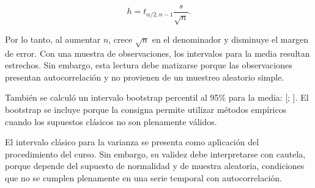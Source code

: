 \[
    h = t_{\alpha/2,n-1}\frac{s}{\sqrt{n}}.
\]

Por lo tanto, al aumentar \(n\), crece \(\sqrt{n}\) en el denominador y disminuye el margen de error. Con una muestra de \TotalRegistros{} observaciones, los intervalos para la media resultan estrechos. Sin embargo, esta lectura debe matizarse porque las observaciones presentan autocorrelación y no provienen de un muestreo aleatorio simple.

También se calculó un intervalo bootstrap percentil al 95\% para la media: [\BootstrapMediaInf{}; \BootstrapMediaSup{}]. El bootstrap se incluye porque la consigna permite utilizar métodos empíricos cuando los supuestos clásicos no son plenamente válidos.

El intervalo clásico para la varianza se presenta como aplicación del procedimiento del curso. Sin embargo, su validez debe interpretarse con cautela, porque depende del supuesto de normalidad y de muestra aleatoria, condiciones que no se cumplen plenamente en una serie temporal con autocorrelación.
